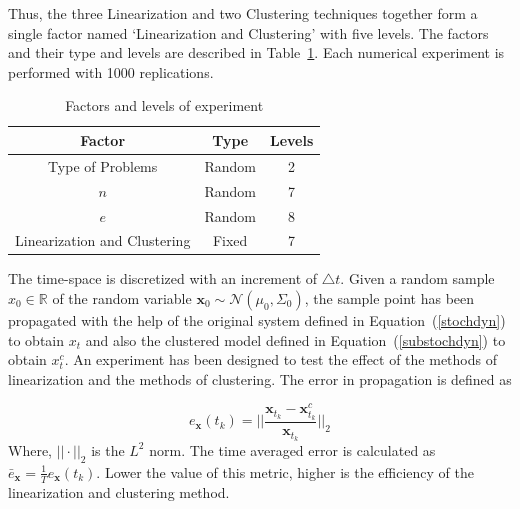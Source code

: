 \begin{table}[H]
\centering
\caption{Techniques of Linearization and Clustering}
\label{techniques}
\end{table}

  Thus, the three Linearization and two Clustering techniques together form a single factor named `Linearization and Clustering' with five levels. The factors and their type and levels are described in Table~\ref{factors}. Each numerical experiment is performed with 1000 replications. 

\begin{table}[H]
\centering
\caption{Factors and levels of experiment}
\label{factors}
\begin{tabular}{|c|c|c|}
\hline 
Factor & Type & Levels \\ 
\hline 
Type of Problems & Random & 2 \\ 
\hline 
$n$ & Random & 7 \\ 
\hline 
$e$ & Random & 8 \\ 
\hline 
Linearization and Clustering & Fixed & 7 \\ 
\hline 
\end{tabular} 
\end{table}


 The time-space is discretized with an increment of $\bigtriangleup t$. Given a random sample $x_0 \in \mathbb{R}$ of the random variable $\mathbf{x}_0 \sim \mathcal{N}(\mu_0, \Sigma_0)$, the sample point has been propagated with the help of the original system defined in Equation~(\ref{stochdyn}) to obtain $x_t$ and also the clustered model defined in Equation~(\ref{substochdyn}) to obtain $x_t^c$. An experiment has been designed to test the effect of the methods of linearization and the methods of clustering. The error in propagation is defined as 
 
 \begin{equation}
e_{\textbf{x}}(t_k) = \bigg|\bigg| \frac{\textbf{x}_{t_k} - \textbf{x}^c_{t_k} }{ \textbf{x}_{t_k} }\bigg|\bigg|_2 
\end{equation}
Where, $|| \cdot ||_2$ is the $L^2$ norm. The time averaged error is calculated as $\bar{e}_{\textbf{x}} = \frac{1}{T} e_{\textbf{x}}(t_k)$. Lower the value of this metric, higher is the efficiency of the linearization and clustering method.  



